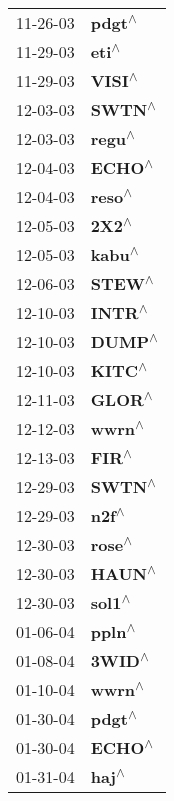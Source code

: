 \begin{supertabular}{p{0.08\textwidth}p{0.2\textwidth}}
 11-26-03 &    \textbf{pdgt\textsuperscript{$\wedge$}} \\
 11-29-03 &     \textbf{eti\textsuperscript{$\wedge$}} \\
 11-29-03 &    \textbf{VISI\textsuperscript{$\wedge$}} \\
 12-03-03 &    \textbf{SWTN\textsuperscript{$\wedge$}} \\
 12-03-03 &    \textbf{regu\textsuperscript{$\wedge$}} \\
 12-04-03 &    \textbf{ECHO\textsuperscript{$\wedge$}} \\
 12-04-03 &    \textbf{reso\textsuperscript{$\wedge$}} \\
 12-05-03 &     \textbf{2X2\textsuperscript{$\wedge$}} \\
 12-05-03 &    \textbf{kabu\textsuperscript{$\wedge$}} \\
 12-06-03 &    \textbf{STEW\textsuperscript{$\wedge$}} \\
 12-10-03 &    \textbf{INTR\textsuperscript{$\wedge$}} \\
 12-10-03 &    \textbf{DUMP\textsuperscript{$\wedge$}} \\
 12-10-03 &    \textbf{KITC\textsuperscript{$\wedge$}} \\
 12-11-03 &    \textbf{GLOR\textsuperscript{$\wedge$}} \\
 12-12-03 &    \textbf{wwrn\textsuperscript{$\wedge$}} \\
 12-13-03 &     \textbf{FIR\textsuperscript{$\wedge$}} \\
 12-29-03 &    \textbf{SWTN\textsuperscript{$\wedge$}} \\
 12-29-03 &     \textbf{n2f\textsuperscript{$\wedge$}} \\
 12-30-03 &    \textbf{rose\textsuperscript{$\wedge$}} \\
 12-30-03 &    \textbf{HAUN\textsuperscript{$\wedge$}} \\
 12-30-03 &    \textbf{sol1\textsuperscript{$\wedge$}} \\
 01-06-04 &    \textbf{ppln\textsuperscript{$\wedge$}} \\
 01-08-04 &    \textbf{3WID\textsuperscript{$\wedge$}} \\
 01-10-04 &    \textbf{wwrn\textsuperscript{$\wedge$}} \\
 01-30-04 &    \textbf{pdgt\textsuperscript{$\wedge$}} \\
 01-30-04 &    \textbf{ECHO\textsuperscript{$\wedge$}} \\
 01-31-04 &     \textbf{haj\textsuperscript{$\wedge$}} \\

\end{supertabular}
